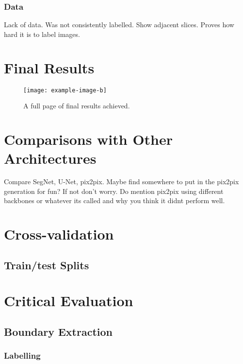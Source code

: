 \subsubsection{Data}

Lack of data. Was not consistently labelled. Show adjacent slices. Proves how hard it is to label images.

\section{Final Results}

\begin{figure}[!p]
    \centering
    \texttt{[image: example-image-b]}
    \caption{A full page of final results achieved.}
    \label{fig:finalresults}
\end{figure}

\section{Comparisons with Other Architectures}

Compare SegNet, U-Net, pix2pix. Maybe find somewhere to put in the pix2pix generation for fun? If not don't worry. Do mention pix2pix using different backbones or whatever its called and why you think it didnt perform well.

\section{Cross-validation}
\label{sec:evalcrossval}

\subsection{Train/test Splits}

\section{Critical Evaluation}

\subsection{Boundary Extraction}

\subsubsection{Labelling}

